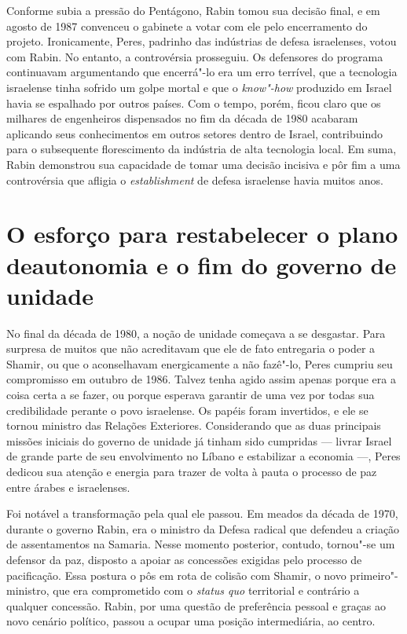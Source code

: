 Conforme subia a pressão do Pentágono, Rabin tomou sua decisão final, e
em agosto de 1987 convenceu o gabinete a votar com ele pelo encerramento do
projeto. Ironicamente, Peres, padrinho das indústrias de defesa
israelenses, votou com Rabin. No entanto, a controvérsia prosseguiu. Os
defensores do programa continuavam argumentando que encerrá"-lo era um
erro terrível, que a tecnologia israelense tinha sofrido um golpe mortal
e que o \emph{know"-how} produzido em Israel havia se espalhado por outros
países. Com o tempo, porém, ficou claro que os milhares de engenheiros
dispensados no fim da década de 1980 acabaram aplicando seus
conhecimentos em outros setores dentro de Israel, contribuindo para o
subsequente florescimento da indústria de alta tecnologia local. Em
suma, Rabin demonstrou sua capacidade de tomar uma decisão incisiva e
pôr fim a uma controvérsia que afligia o \emph{establishment} de defesa
israelense havia muitos anos.

\section[O esforço para restabelecer o plano de autonomia]{O esforço para restabelecer o plano de\break autonomia e o fim do governo de unidade}

No final da década de 1980, a noção de unidade começava a se
desgastar. Para surpresa de muitos que não acreditavam que ele de fato
entregaria o poder a Shamir, ou que o aconselhavam energicamente a não
fazê"-lo, Peres cumpriu seu compromisso em outubro de 1986. Talvez tenha
agido assim apenas porque era a coisa certa a se fazer, ou porque
esperava garantir de uma vez por todas sua credibilidade perante o
povo israelense. Os papéis foram invertidos, e ele se tornou ministro
das Relações Exteriores. Considerando que as duas principais missões
iniciais do governo de unidade já tinham sido cumpridas --- livrar Israel
de grande parte de seu envolvimento no Líbano e estabilizar a economia
---, Peres dedicou sua atenção e energia para trazer de volta à pauta o
processo de paz entre árabes e israelenses.

Foi notável a transformação pela qual ele passou. Em meados da década de
1970, durante o governo Rabin, era o ministro da Defesa radical que
defendeu a criação de assentamentos na Samaria. Nesse momento
posterior, contudo, tornou"-se um defensor da paz, disposto a apoiar as concessões
exigidas pelo processo de pacificação. Essa postura o pôs em rota de
colisão com Shamir, o novo primeiro"-ministro, que era comprometido com o
\emph{status quo} territorial e contrário a qualquer concessão. Rabin, por uma
questão de preferência pessoal e graças ao novo cenário político, passou
a ocupar uma posição intermediária, ao centro.

